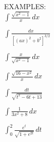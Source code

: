 \documentclass[11pt]{article}
\begin{document}
EXAMPLES:\\


$\int \frac{\sqrt{x^2-1}}{x} \, dx$

\vspace{2in}

$\int \frac{dx}{[(ax)^2+b^2]^{3/2}} $

\vspace{2in}

$\int  \frac{x}{\sqrt{x^2-1}} \, dx$

\vspace{2in}

$\int  \frac{\sqrt{16-x^2}}{x} \, dx$

\vspace{2in}


$\int \frac{dt}{\sqrt{t^2-6t+13}} $

\vspace{2in}


$\int  \frac{1}{3x^2+8} \, dx$


\vspace{2in}


$\int_0^2  \frac{e^t}{\sqrt{1+e^{2t}}} \, dt$
\end{document}
